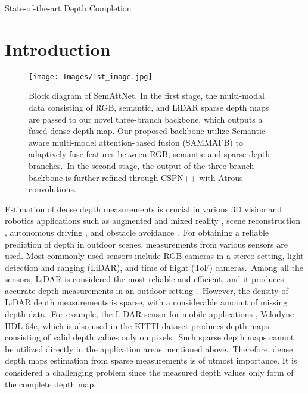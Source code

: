 \documentclass{ieeeaccess}
\begin{document}
\begin{keywords}
State-of-the-art Depth Completion
\end{keywords}

\titlepgskip=-15pt

\maketitle

\section{Introduction}
\label{sec:introduction}
\begin{figure}
\begin{center}
    \texttt{[image: Images/1st\_image.jpg]} 
\end{center}
\caption{Block diagram of SemAttNet. In the first stage, the multi-modal data consisting of RGB, semantic, and LiDAR sparse depth maps are passed to our novel three-branch backbone, which outputs a fused dense depth map. Our proposed backbone utilize Semantic-aware multi-model attention-based fusion (SAMMAFB) to adaptively fuse features between RGB, semantic and sparse depth branches.~In the second stage, the output of the three-branch backbone is further refined through CSPN++ with Atrous convolutions. }
\label{figure1}
\end{figure}
Estimation of dense depth measurements is crucial in various 3D vision and robotics applications such as augmented and mixed reality  \cite{holynski2018fast, augmented_app},  scene reconstruction  \cite{3DReconstruction, park2020non}, autonomous driving \cite{DepthNet, fisheyeautonomous}, and obstacle avoidance \cite{obstacle_avoid, tang2020learning}.~For obtaining a reliable prediction of depth in outdoor scenes, measurements from various sensors are used. Most commonly used sensors include RGB cameras in a stereo setting, light detection and ranging (LiDAR), and time of flight (ToF) cameras\cite{tof}.~Among all the sensors, LiDAR is considered the most reliable and efficient, and it produces accurate depth measurements in an outdoor setting \cite{tang2020learning}.~However, the density of LiDAR depth measurements is sparse, with a considerable amount of missing depth data\cite{KITTI, kitti_2}.~For example, the LiDAR sensor for mobile applications \cite{tang2020learning}, Velodyne HDL-64e, which is also used in the KITTI \cite{KITTI, kitti_2} dataset produces depth maps consisting of valid depth values only on  pixels.~Such sparse depth maps cannot be utilized directly in the application areas mentioned above.~Therefore, dense depth maps estimation from sparse measurements is of utmost importance. It is considered a challenging problem since the measured depth values only form  of the complete depth map.
\end{document}
